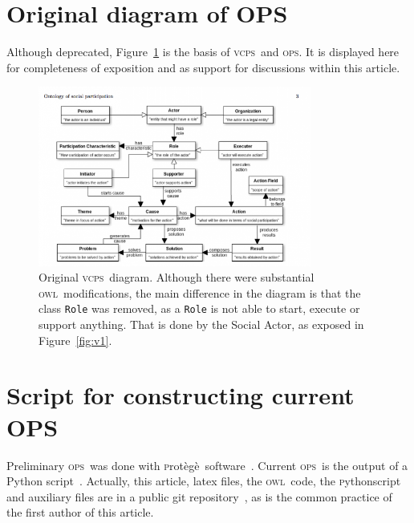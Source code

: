 \documentclass[10pt,letterpaper]{article}
\newcommand{\ops}{\textsc{ops}}
\newcommand{\vcps}{\textsc{vcps}}
\newcommand{\owl}{\textsc{owl}}
\newcommand{\python}{\textsc{p}ython}
\newcommand{\protege}{\textsc{p}rot\`eg\`e}
\begin{document}
\section{Original diagram of OPS}\label{ap:dia}
Although deprecated, Figure~\ref{fig:diaorig} is the basis of \vcps\ and \ops. It is displayed here for completeness of exposition and as support for discussions within this article. 
\begin{figure}[t]
    \centering
    \includegraphics[width=0.8\textwidth]{figs/diagramaOriginal}
    \caption{Original \vcps\ diagram. Although there were substantial \owl\ modifications, the main difference in the diagram is that the class \texttt{Role} was removed, as a \texttt{Role} is not able to start, execute or support anything. That is done by the Social Actor, as exposed in Figure~\ref{fig:v1}.}
    \label{fig:diaorig}
\end{figure}

\section{Script for constructing current OPS}\label{ap:script}
Preliminary \ops\ was done with \protege\ software~\cite{protege}. Current \ops\ is the output of a Python script~\cite{opsScript}. Actually, this article, latex files, the \owl\ code, the \python script and auxiliary files are in a public git repository~\cite{opsRepo}, as is the common practice of the first author of this article.
\end{document}
